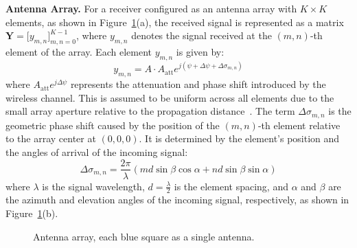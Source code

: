 \textbf{Antenna Array.}  
For a receiver configured as an antenna array with $K \times K$ elements, as shown in Figure~\ref{fig_array}(a), the received signal is represented as a matrix $\mathbf{Y} = \big[y_{m,n}\big]_{m,n=0}^{K-1}$, where $y_{m,n}$ denotes the signal received at the $(m, n)$-th element of the array. 
Each element $y_{m,n}$ is given by:
\begin{equation}
y_{m,n} = A \cdot A_{\text{att}} e^{j(\psi + \Delta \psi + \Delta \sigma_{m,n})}
\end{equation}
where $A_{\text{att}} e^{j\Delta \psi}$ represents the attenuation and phase shift introduced by the wireless channel. This is assumed to be uniform across all elements due to the small array aperture relative to the propagation distance~\cite{van2002optimum}.
The term $\Delta \sigma_{m,n}$ is the geometric phase shift caused by the position of the $(m, n)$-th element relative to the array center at $(0, 0, 0)$. It is determined by the element's position and the angles of arrival of the incoming signal:
\begin{equation}
\label{eqn_geomtry}
\Delta \sigma_{m,n} = \frac{2\pi}{\lambda} \left( m d \sin\beta \cos\alpha + n d \sin\beta \sin\alpha \right)
\end{equation}
where $\lambda$ is the signal wavelength, $d = \frac{\lambda}{2}$ is the element spacing, and $\alpha$ and $\beta$ are the azimuth and elevation angles of the incoming signal, respectively, as shown in Figure~\ref{fig_array}(b).





\begin{figure}[t]
\centering
	\vspace{-0.15in}
\caption{Antenna array, each blue square as a single antenna.}
\label{fig_array}
\end{figure}


